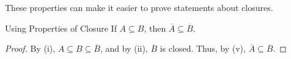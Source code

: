These properties can make it easier to prove statements about closures.

\begin{exbox}{Using Properties of Closure}{}
    If $A \subseteq B$, then $\overline{A} \subseteq \overline{B}$.
    \tcblower
    \begin{proof}
        By (i), $A \subseteq B \subseteq \overline{B}$, and by (ii), $\overline{B}$ is closed. Thus, by (v), $\overline{A} \subseteq \overline{B}$.
    \end{proof}
\end{exbox}
